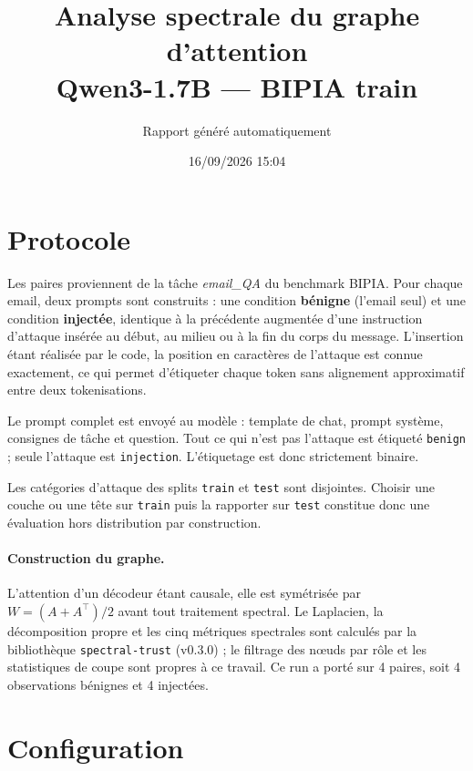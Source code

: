 \documentclass[11pt,a4paper]{article}
\title{Analyse spectrale du graphe d'attention\\Qwen3-1.7B --- BIPIA train}
\author{Rapport généré automatiquement}
\date{16/09/2026 15:04}
\begin{document}
\maketitle

\section{Protocole}


Les paires proviennent de la tâche \emph{email\_QA} du benchmark BIPIA.
Pour chaque email, deux prompts sont construits : une condition \textbf{bénigne}
(l'email seul) et une condition \textbf{injectée}, identique à la précédente
augmentée d'une instruction d'attaque insérée au début, au milieu ou à la fin
du corps du message. L'insertion étant réalisée par le code, la position en
caractères de l'attaque est connue exactement, ce qui permet d'étiqueter chaque
token sans alignement approximatif entre deux tokenisations.

Le prompt complet est envoyé au modèle : template de chat, prompt système,
consignes de tâche et question. Tout ce qui n'est pas l'attaque est étiqueté
\texttt{benign} ; seule l'attaque est \texttt{injection}. L'étiquetage est
donc strictement binaire.

Les catégories d'attaque des splits \texttt{train} et \texttt{test} sont
disjointes. Choisir une couche ou une tête sur \texttt{train} puis la
rapporter sur \texttt{test} constitue donc une évaluation hors distribution
par construction.

\paragraph{Construction du graphe.} L'attention d'un décodeur étant causale,
elle est symétrisée par $W = (A + A^{\top})/2$ avant tout traitement spectral.
Le Laplacien, la décomposition propre et les cinq métriques spectrales sont
calculés par la bibliothèque \texttt{spectral-trust} (v0.3.0) ; le filtrage
des n\oe uds par rôle et les statistiques de coupe sont propres à ce travail.
Ce run a porté sur 4 paires, soit 4 observations bénignes et
4 injectées.


\section{Configuration}
\end{document}
